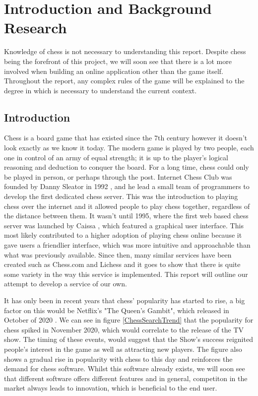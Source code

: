 \chapter{Introduction and Background Research}

\label{chapter1}

Knowledge of chess is not necessary to understanding this report. Despite chess being the forefront of this project, we will soon see that there is a lot more involved when building an online application other than the game itself. Throughout the report, any complex rules of the game will be explained to the degree in which is necessary to understand the current context.

\section{Introduction}
\label{sec:Introduction}

Chess is a board game that has existed since the 7th century \cite{HistoryOfChess} however it doesn't look exactly as we know it today. The modern game is played by two people, each one in control of an army of equal strength; it is up to the player's logical reasoning and deduction to conquer the board. For a long time, chess could only be played in person, or perhaps through the post. Internet Chess Club was founded by Danny Sleator in 1992 \cite{InternetChessClub}, and he lead a small team of programmers to develop the first dedicated chess server. This was the introduction to playing chess over the internet and it allowed people to play chess together, regardless of the distance between them. It wasn't until 1995, where the first web based chess server was launched by Caissa \cite{CaissaAboutPage}, which featured a graphical user interface. This most likely contributed to a higher adoption of playing chess online because it gave users a friendlier interface, which was more intuitive and approachable than what was previously available. Since then, many similar services have been created such as Chess.com and Lichess and it goes to show that there is quite some variety in the way this service is implemented. This report will outline our attempt to develop a service of our own.

It has only been in recent years that chess' popularity has started to rise, a big factor on this would be Netflix's "The Queen's Gambit", which released in October of 2020 \cite{TheQueensGambit}. We can see in figure \ref{ChessSearchTrend} that the popularity for chess spiked in November 2020, which would correlate to the release of the TV show. The timing of these events, would suggest that the Show's success reignited people's interest in the game as well as attracting new players. The figure also shows a gradual rise in popularity with chess to this day and reinforces the demand for chess software. Whilst this software already exists, we will soon see that different software offers different features and in general, competiton in the market always leads to innovation, which is beneficial to the end user.

